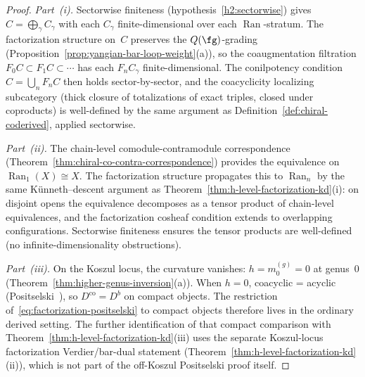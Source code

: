 \begin{proof}
\emph{Part~(i).}
Sectorwise finiteness (hypothesis~\ref{h2:sectorwise}) gives
$C = \bigoplus_{\gamma} C_\gamma$ with each $C_\gamma$
finite-dimensional over each $\operatorname{Ran}$-stratum.
The factorization structure on~$C$ preserves the
$Q(\fg)$-grading (Proposition~\ref{prop:yangian-bar-loop-weight}(a)),
so the coaugmentation filtration
$F_0 C \subset F_1 C \subset \cdots$ has each
$F_n C_\gamma$ finite-dimensional. The conilpotency condition
$C = \bigcup_n F_n C$ then holds sector-by-sector, and the
coacyclicity localizing subcategory (thick closure of totalizations
of exact triples, closed under coproducts) is well-defined
by the same argument as
Definition~\ref{def:chiral-coderived}, applied sectorwise.

\emph{Part~(ii).}
The chain-level comodule-contramodule correspondence
(Theorem~\ref{thm:chiral-co-contra-correspondence}) provides the
equivalence on
$\operatorname{Ran}_1(X) \cong X$. The factorization structure
propagates this to $\operatorname{Ran}_n$ by the same
K\"unneth--descent argument as
Theorem~\ref{thm:h-level-factorization-kd}(i):
on disjoint opens the equivalence decomposes as a tensor product
of chain-level equivalences, and the factorization cosheaf
condition extends to overlapping configurations. Sectorwise
finiteness ensures the tensor products are well-defined
(no infinite-dimensionality obstructions).

\emph{Part~(iii).}
On the Koszul locus, the curvature vanishes:
$h = m_0^{(g)} = 0$ at genus~$0$
(Theorem~\ref{thm:higher-genus-inversion}(a)). When $h = 0$,
coacyclic = acyclic (Positselski~\cite[Thm~3.7]{Positselski11}),
so $D^{\mathrm{co}} = D^b$ on compact objects. The restriction
of~\eqref{eq:factorization-positselski} to compact objects therefore
lives in the ordinary derived setting. The further identification of
that compact comparison with
Theorem~\ref{thm:h-level-factorization-kd}(iii) uses the separate
Koszul-locus factorization Verdier/bar-dual statement
\textup{(}Theorem~\textup{\ref{thm:h-level-factorization-kd}(ii)}\textup{)},
which is not part of the off-Koszul Positselski proof itself.
\end{proof}

